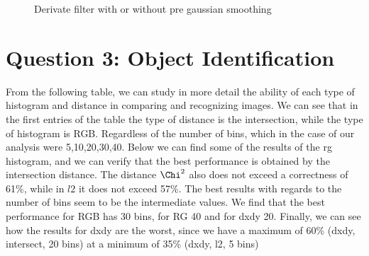 \documentclass{article}
\begin{document}
\begin{figure}[!h]
	\begin{center}
		\hspace{2mm}
		
	\end{center}
	\captionsetup{justification=raggedright,margin=1cm}
	\caption{Derivate filter with or without pre gaussian smoothing}
	\label{Filtered_all}
\end{figure}


\section{Question 3: Object Identification }

From the following table, we can study in more detail the ability of each type of histogram and distance in comparing and recognizing images. We can see that in the first entries of the table the type of distance is the intersection, while the type of histogram is RGB. Regardless of the number of bins, which in the case of our analysis were 5,10,20,30,40. Below we can find some of the results of the rg histogram, and we can verify that the best performance is obtained by the intersection distance. The distance $\Chi^2$ also does not exceed a correctness of 61\%, while in $l2$ it does not exceed 57\%. The best results with regards to the number of bins seem to be the intermediate values. We find that the best performance for RGB has 30 bins, for RG 40 and for dxdy 20. Finally, we can see how the results for dxdy are the worst, since we have a maximum of 60\% (dxdy, intersect, 20 bins) at a minimum of 35\% (dxdy, l2, 5 bins)\\
\end{document}
